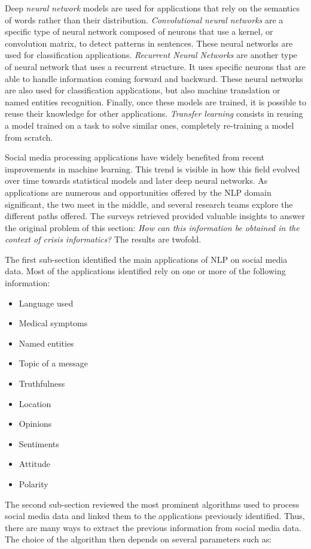 Deep \emph{neural network} models are used for applications that rely on the semantics of words rather than their distribution.
\emph{Convolutional neural networks} are a specific type of neural network composed of neurons that use a kernel, or convolution matrix, to detect patterns in sentences.
These neural networks are used for classification applications.
\emph{Recurrent Neural Networks} are another type of neural network that uses a recurrent structure.
It uses specific neurons that are able to handle information coming forward and backward.
These neural networks are also used for classification applications, but also machine translation or named entities recognition.
Finally, once these models are trained, it is possible to reuse their knowledge for other applications.
\emph{Transfer learning} consists in reusing a model trained on a task to solve similar ones, completely re-training a model from scratch.

Social media processing applications have widely benefited from recent improvements in machine learning.
This trend is visible in how this field evolved over time towards statistical models and later deep neural networks.
As applications are numerous and opportunities offered by the NLP domain significant, the two meet in the middle, and several research teams explore the different paths offered.
The surveys retrieved provided valuable insights to answer the original problem of this section: \emph{How can this information be obtained in the context of crisis informatics?}
The results are twofold.

The first sub-section identified the main applications of NLP on social media data.
Most of the applications identified rely on one or more of the following information:

\begin{itemize}
    \item Language used
    \item Medical symptoms
    \item Named entities
    \item Topic of a message
    \item Truthfulness
    \item Location
    \item Opinions
    \item Sentiments
    \item Attitude
    \item Polarity
\end{itemize}

The second sub-section reviewed the most prominent algorithms used to process social media data and linked them to the applications previously identified.
Thus, there are many ways to extract the previous information from social media data.
The choice of the algorithm then depends on several parameters such as:

